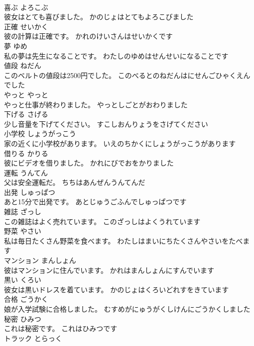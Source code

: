 \documentclass[8pt]{extreport}
\begin{document}
\begin{CJK}{UTF8}{min}
\\	喜ぶ	よろこぶ	
\\	彼女はとても喜びました。	かのじょはとてもよろこびました	
\\	正確	せいかく	
\\	彼の計算は正確です。	かれのけいさんはせいかくです	
\\	夢	ゆめ	
\\	私の夢は先生になることです。	わたしのゆめはせんせいになることです	
\\	値段	ねだん	
\\	このベルトの値段は2500円でした。	このべるとのねだんはにせんごひゃくえんでした	
\\	やっと	やっと	
\\	やっと仕事が終わりました。	やっとしごとがおわりました	
\\	下げる	さげる	
\\	少し音量を下げてください。	すこしおんりょうをさげてください	
\\	小学校	しょうがっこう	
\\	家の近くに小学校があります。	いえのちかくにしょうがっこうがあります	
\\	借りる	かりる	
\\	彼にビデオを借りました。	かれにびでおをかりました	
\\	運転	うんてん	
\\	父は安全運転だ。	ちちはあんぜんうんてんだ	
\\	出発	しゅっぱつ	
\\	あと15分で出発です。	あとじゅうごふんでしゅっぱつです	
\\	雑誌	ざっし	
\\	この雑誌はよく売れています。	このざっしはよくうれています	
\\	野菜	やさい	
\\	私は毎日たくさん野菜を食べます。	わたしはまいにちたくさんやさいをたべます	
\\	マンション	まんしょん	
\\	彼はマンションに住んでいます。	かれはまんしょんにすんでいます	
\\	黒い	くろい	
\\	彼女は黒いドレスを着ています。	かのじょはくろいどれすをきています	
\\	合格	ごうかく	
\\	娘が入学試験に合格しました。	むすめがにゅうがくしけんにごうかくしました	
\\	秘密	ひみつ	
\\	これは秘密です。	これはひみつです	
\\	トラック	とらっく	

\end{CJK}
\end{document}
